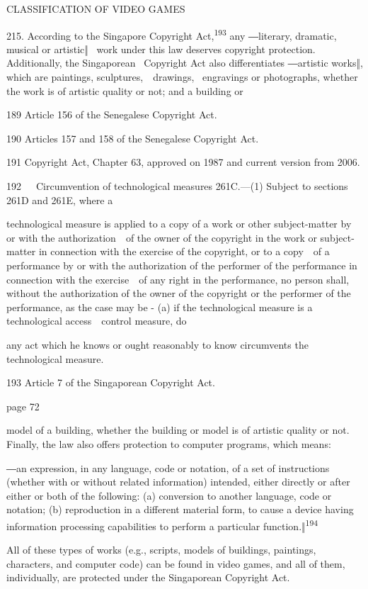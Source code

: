 \documentclass[
]{article}
\begin{document}
{CLASSIFICATION OF VIDEO GAMES}

{215. }{According to the Singapore }{Copyright
Act,}\textsuperscript{{193 }}{any ―}{literary, dramatic, musical or
artistic‖ }{~work under this law deserves copyright protection.
Additionally, the Singaporean }{~Copyright Act }{also differentiates
―artistic works‖, which are paintings, sculptures,~~drawings,
}{~engravings or photographs, whether the work is of artistic quality or
not; and a building or}

{189 }{Article 156 of the Senegalese }{Copyright Act}{.}

{190 }{Articles 157 and 158 of the Senegalese }{Copyright Act}{.}

{191 }{Copyright Act}{, Chapter 63, approved on 1987 and current version
from 2006.}

{192}{~~~}{Circumvention of technological measures 261C.}{---}{(1)
Subject to sections 261D and 261E, where a}

{technological measure is applied to a copy of a work or other
subject-matter by or with the authorization~~of the owner of the
copyright in the work or subject-matter in connection with the exercise
of the copyright, or to a copy~~of a performance by or with the
authorization of the performer of the performance in connection with the
exercise~~of any right in the performance, no person shall, without the
authorization of the owner of the copyright or the performer of the
performance, as the case may be - (a) if the technological measure is a
technological access~~control measure, do}

{any act which he knows or ought reasonably to know circumvents the
technological measure.}

{193 }{Article 7 of the Singaporean }{Copyright Act}{.}

{page 72}

{model of a building, whether the building or model is of artistic
quality or not. Finally, the law also offers protection to computer
programs, which means:}

{―}{an expression, in any language, code or notation, of a set of
instructions (whether with or without related information) intended,
either directly or after either or both of the following: (a) conversion
to another language, code or notation; (b) reproduction in a different
material form, to cause a device having information processing
capabilities to perform a }{particular
function.‖}\textsuperscript{{194}}

{All of these types of works (e.g., scripts, models of buildings,
paintings, characters, and computer code) can be found in video games,
and all of them, individually, are protected under the Singaporean
}{Copyright Act}{.}
\end{document}
